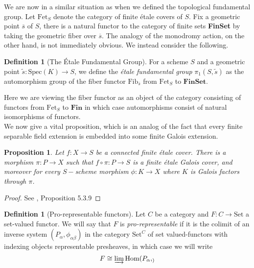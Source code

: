 \documentclass{article}
\theoremstyle{definition}
\newtheorem{definition}[theorem]{Definition}
\theoremstyle{remark}
\theoremstyle{plain}
\newtheorem{proposition}[theorem]{Proposition}
\begin{document}
We are now in a similar situation as when we defined the topological fundamental group.
Let $\text{Fet}_S$ denote the category of finite \'etale covers of $S$.
Fix a geometric point $\overline{s}$ of $S$, there is a natural functor to the category of finite sets \textbf{FinSet} by taking the geometric fiber over $\overline{s}$. 
The analogy of the monodromy action, on the other hand, is not immediately obvious.
We instead consider the following.

\begin{definition}[The \'Etale Fundamental Group]
	For a scheme $S$ and a geometric point $\widetilde{s}: \text{Spec}(K) \to S$, we define the \textit{\'etale fundamental group} $\pi_1(S, \widetilde{s})$ as the automorphism group of the fiber functor $\text{Fib}_{\overline{s}}$ from $\text{Fet}_{S}$ to $\textbf{FinSet}$.
\end{definition}

Here we are viewing the fiber functor as an object of the category consisting of functors from $\text{Fet}_S$ to $\textbf{Fin}$ in which case automorphisms consist of natural isomorphisms of functors.\\

We now give a vital proposition, which is an analog of the fact that every finite separable field extension is embedded into some finite Galois extension.  


\begin{proposition}
	Let $f: X \to S$ be a connected finite \'etale cover. 
	There is a morphism $\pi: P \to X$ such that $f \circ \pi: P \to S$ is a finite \'etale Galois cover, and moreover for every $S-$scheme morphism $\phi:K  \to X$ where $K$ is Galois factors through $\pi$.
\end{proposition}

\begin{proof}
	See \cite{Szamuely}, Proposition 5.3.9
\end{proof}

\begin{definition}[Pro-representable functors]
	Let $C$ be a category and $F: C \to \text{Set}$ a set-valued functor.
	We will say that $F$ is \textit{pro-representable} if it is the colimit of an inverse system $(P_{\alpha}, \phi_{\alpha \beta})$ in the category $\text{Set}^C$ of set valued-functors with indexing objects representable presheaves, in which case we will write 
	\[F \cong \varinjlim \text{Hom}(P_{\alpha}, _)\]
\end{definition} 
\end{document}
